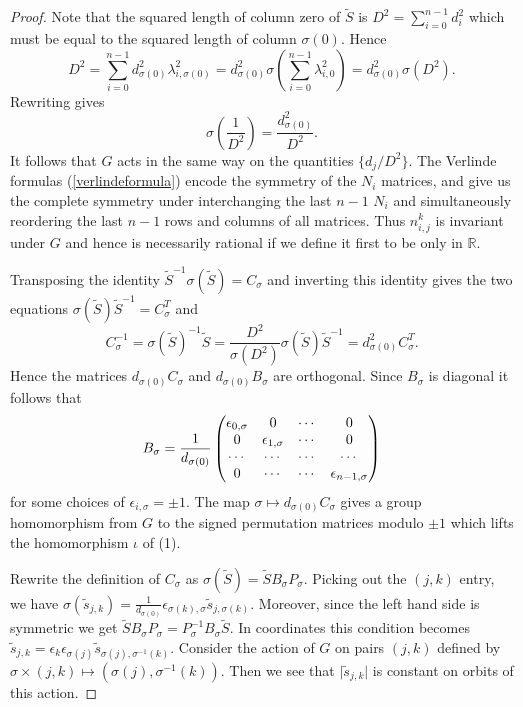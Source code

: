 \documentclass[12pt,psamsfonts]{amsart}
\newcommand{\e}{{\epsilon}}
\newcommand{\R}{\mathbb{R}}
\numberwithin{equation}{section}
\theoremstyle{definition}
\begin{document}
\begin{proof}
Note that the squared length of column zero of $\tilde S$ is
$D^2=\sum_{i=0}^{n-1} d_i^2$ which must be equal to the squared
length of column $\sigma(0)$. Hence
$$D^2 = \sum_{i=0}^{n-1} d_{\sigma(0)}^2 \lambda_{i,\sigma(0)}^2 =
d_{\sigma(0)}^2 \sigma\left(\sum_{i=0}^{n-1}
\lambda_{i,0}^2\right)= d_{\sigma(0)}^2 \sigma(D^2).$$ Rewriting
gives
$$\sigma\left(\frac{1}{D^2}\right) = \frac{d_{\sigma(0)}^2}{D^2}.$$
It follows that $G$ acts in the same way on the quantities $\{
d_j/D^2\}$.  The Verlinde
formulas (\ref{verlindeformula}) encode the symmetry of the $N_i$ matrices,
and give us
the complete symmetry under interchanging the last $n-1$ $N_i$ and
simultaneously reordering the last $n-1$ rows and columns of all
matrices.  Thus $n_{i,j}^k$ is invariant under $G$ and hence is
necessarily rational if we define it first to be only in $\R$.

Transposing the identity $\tilde S^{-1} \sigma(\tilde
S)=C_{\sigma}$ and inverting this identity gives the two equations
$\sigma(\tilde S) \tilde S^{-1} = C_{\sigma}^T$ and
$$C_{\sigma}^{-1} = \sigma(\tilde S)^{-1} \tilde S =
\frac{D^2}{\sigma(D^2)} \sigma(\tilde S) \tilde S^{-1} =
d_{\sigma(0)}^2 C_{\sigma}^T.$$ Hence the matrices $d_{\sigma(0)}
C_{\sigma}$ and $d_{\sigma(0)} B_{\sigma}$ are orthogonal. Since
$B_{\sigma}$ is diagonal it follows that
$$B_{\sigma}= \frac{1}{d_{\sigma(0)}} \left(\begin{matrix} \e_{0,\sigma} &
0 & \cdots & 0\cr 0 & \e_{1,\sigma} & \cdots & 0\cr \cdots &
\cdots & \cdots & \cdots \cr 0 & \cdots & \cdots &
\e_{n-1,\sigma}\end{matrix}\right)$$ for some choices of
$\e_{i,\sigma}=\pm 1$. The map $\sigma\mapsto d_{\sigma(0)}
C_{\sigma}$ gives a group homomorphism from $G$ to the signed
permutation matrices modulo $\pm 1$ which lifts the homomorphism
$\iota$ of (1).


Rewrite the definition of $C_{\sigma}$ as $\sigma(\tilde S)=
\tilde S B_{\sigma} P_{\sigma}$. Picking out the $(j,k)$ entry, we
have
$\sigma(\tilde{s}_{j,k})=\frac{1}{d_{\sigma(0)}}\e_{\sigma(k),\sigma}\tilde{s}_{j,\sigma(k)}$.
 Moreover, since the left hand side is symmetric we get $\tilde S B_{\sigma}
P_{\sigma} = P_{\sigma}^{-1} B_{\sigma} \tilde S$. In coordinates
this condition becomes $\tilde s_{j,k}=\e_{k} \e_{\sigma(j)}
\tilde s_{\sigma(j),\sigma^{-1}(k)}$. Consider the action of $G$
on pairs $(j,k)$ defined by $\sigma\times (j,k)\mapsto
(\sigma(j),\sigma^{-1}(k))$. Then we see that $\vert \tilde
s_{j,k}\vert$ is constant on orbits of this action.


\end{proof}
\end{document}
